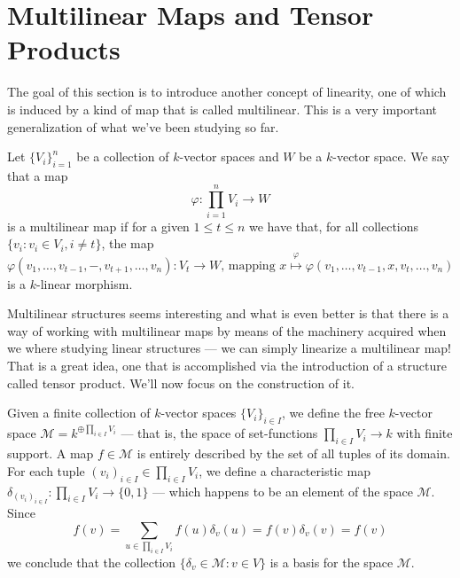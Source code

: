 
\section{Multilinear Maps and Tensor Products}

The goal of this section is to introduce another concept of linearity, one of
which is induced by a kind of map that is called multilinear. This is a very
important generalization of what we've been studying so far.

\begin{definition}\label{def: multilinear map}
    Let \(\{V_i\}_{i=1}^n\) be a collection of \(k\)-vector spaces and \(W\) be a
    \(k\)-vector space. We say that a map
    \[
        \varphi: \prod_{i=1}^n V_i \to W
    \]
    is a multilinear map if for a given \(1 \leq t \leq n\) we have that, for all
    collections \(\{v_i \colon v_i \in V_i, i \neq t\}\), the map
    \[
        \varphi(v_1, \dots, v_{t-1}, -, v_{t+1}, \dots, v_n):
        V_t \longrightarrow W
        \text{, mapping }
        x \overset{\varphi}\longmapsto \varphi(v_1, \dots, v_{t-1}, x, v_t, \dots, v_n)
    \]
    is a \(k\)-linear morphism.
\end{definition}

Multilinear structures seems interesting and what is even better is that there
is a way of working with multilinear maps by means of the machinery acquired
when we where studying linear structures --- we can simply linearize a multilinear
map! That is a great idea, one that is accomplished via the introduction of a
structure called tensor product. We'll now focus on the construction of it.

Given a finite collection of \(k\)-vector spaces \(\{V_i\}_{i \in I}\), we define
the free \(k\)-vector space \(\mathcal M = k^{\oplus \prod_{i \in I} V_i}\) --- that is, the
space of set-functions \(\prod_{i \in I} V_i \to k\) with finite support. A map
\(f \in \mathcal M\) is entirely described by the set of all tuples of its domain. For
each tuple \((v_i)_{i \in I} \in \prod_{i \in I} V_i\), we define a characteristic map
\(\delta_{(v_{i})_{i \in I}}: \prod_{i \in I} V_i \to \{0, 1\}\) --- which happens to be an
element of the space \(\mathcal M\). Since
\[
    f(v) = \sum_{u \in \prod_{i \in I}V_i} f(u) \delta_v(u) = f(v) \delta_v(v) = f(v)
\]
we conclude that the collection \(\{\delta_{v} \in \mathcal M \colon v \in V\}\)
is a basis for the space \(\mathcal M\).

